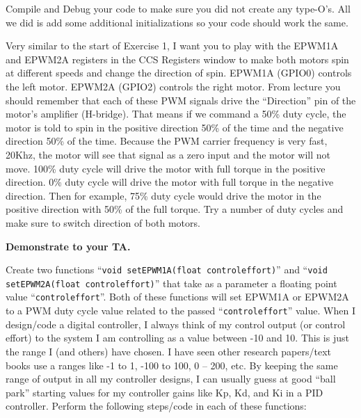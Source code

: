 \documentclass[11pt]{article}
\begin{document}
Compile and Debug your code to make sure you did not create any type-O’s. All we did is add some additional initializations so your code should work the same.


Very similar to the start of Exercise 1, I want you to play with the EPWM1A and EPWM2A registers in the CCS Registers window to make both motors spin at different speeds and change the direction of spin. EPWM1A (GPIO0) controls the left motor. EPWM2A (GPIO2) controls the right motor. From lecture you should remember that each of these PWM signals drive the “Direction” pin of the motor’s amplifier (H-bridge). That means if we command a 50\% duty cycle, the motor is told to spin in the positive direction 50\% of the time and the negative direction 50\% of the time. Because the PWM carrier frequency is very fast, 20Khz, the motor will see that signal as a zero input and the motor will not move. 100\% duty cycle will drive the motor with full torque in the positive direction. 0\% duty cycle will drive the motor with full torque in the negative direction. Then for example, 75\% duty cycle would drive the motor in the positive direction with 50\% of the full torque. Try a number of duty cycles and make sure to switch direction of both motors.
%
\begin{checkoff}
        \textbf{Demonstrate to your TA.}
\end{checkoff}
%
Create two functions “\texttt{void setEPWM1A(float controleffort)}” and “\texttt{void setEPWM2A(float controleffort)}” that take as a parameter a floating point value “\texttt{controleffort}”. Both of these functions will set EPWM1A or EPWM2A to a PWM duty cycle value related to the passed “\texttt{controleffort}” value. When I design/code a digital controller, I always think of my control output (or control effort) to the system I am controlling as a value between -10 and 10. This is just the range I (and others) have chosen. I have seen other research papers/text books use a ranges like -1 to 1, -100 to 100, 0 – 200, etc. By keeping the same range of output in all my controller designs, I can usually guess at good “ball park” starting values for my controller gains like Kp, Kd, and Ki in a PID controller. Perform the following steps/code in each of these functions:
%
\end{document}
